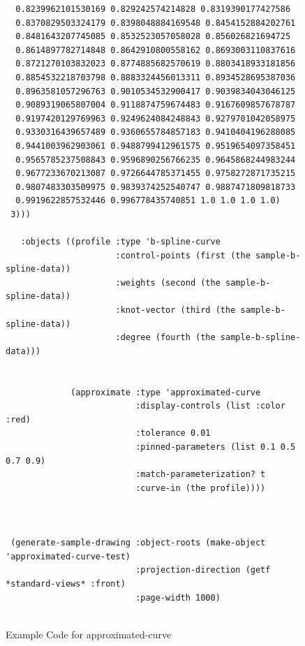 \documentclass [11pt]{book}
\begin{document}
\begin{itemize}
\begin{figure}
\begin{lrbox}{\boxedverb}
\begin{minipage}{\linewidth}
{\begin{verbatim}
  0.8239962101530169 0.829242574214828 0.8319390177427586
  0.8370829503324179 0.8398048884169548 0.8454152884202761
  0.8481643207745085 0.8532523057058028 0.856026821694725
  0.8614897782714848 0.8642910800558162 0.8693003110837616
  0.8721270103832023 0.8774885682570619 0.8803418933181856
  0.8854532218703798 0.8883324456013311 0.8934528695387036
  0.8963581057296763 0.9010534532900417 0.9039834043046125
  0.9089319065807004 0.9118874759674483 0.9167609857678787
  0.9197420129769963 0.9249624084248843 0.9279701042058975
  0.9330316439657489 0.9360655784857183 0.9410404196288085
  0.9441003962903061 0.9488799412961575 0.9519654097358451
  0.9565785237508843 0.9596890256766235 0.9645868244983244
  0.9677233670213087 0.9726644785371455 0.9758272871735215
  0.9807483303509975 0.9839374252540747 0.9887471809818733
  0.9919622857532446 0.996778435740851 1.0 1.0 1.0 1.0)
 3)))
  
   :objects ((profile :type 'b-spline-curve
                      :control-points (first (the sample-b-spline-data))
                      :weights (second (the sample-b-spline-data))
                      :knot-vector (third (the sample-b-spline-data))
                      :degree (fourth (the sample-b-spline-data)))

            
             (approximate :type 'approximated-curve
                          :display-controls (list :color :red)
                          :tolerance 0.01
                          :pinned-parameters (list 0.1 0.5 0.7 0.9)
                          :match-parameterization? t
                          :curve-in (the profile))))



 (generate-sample-drawing :object-roots (make-object 'approximated-curve-test)
                          :projection-direction (getf *standard-views* :front)
                          :page-width 1000)


\end{verbatim}}
\end{minipage}
\end{lrbox}
\fbox{\usebox{\boxedverb}}

\caption{Example Code for approximated-curve}

\label{fig:example-code-approximated-curve}

\end{figure}


\end{itemize}
\end{document}
